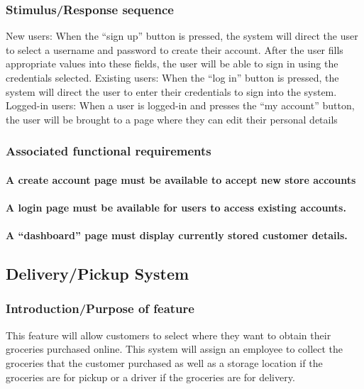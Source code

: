 \documentclass{scrreprt}
\begin{document}
\subsubsection{Stimulus/Response sequence}
\indent New users: When the “sign up” button is pressed, the system will direct the user to select a username and password to create their account.  After the user fills appropriate values into these fields, the user will be able to sign in using the credentials selected.
Existing users: When the “log in” button is pressed, the system will direct the user to enter their credentials to sign into the system.  
Logged-in users: When a user is logged-in and presses the “my account” button, the user will be brought to a page where they can edit their personal details

\subsubsection{Associated functional requirements}
\paragraph[]{\normalfont A create account page must be available to accept new store accounts}
\paragraph[]{\normalfont A login page must be available for users to access existing accounts.}
\paragraph[]{\normalfont A “dashboard” page must display currently stored customer details.}

\subsection{Delivery/Pickup System}
\subsubsection{Introduction/Purpose of feature}
This feature will allow customers to select where they want to obtain their groceries purchased online.  This system will assign an employee to collect the groceries that the customer purchased as well as a storage location if the groceries are for pickup or a driver if the groceries are for delivery.
\end{document}
